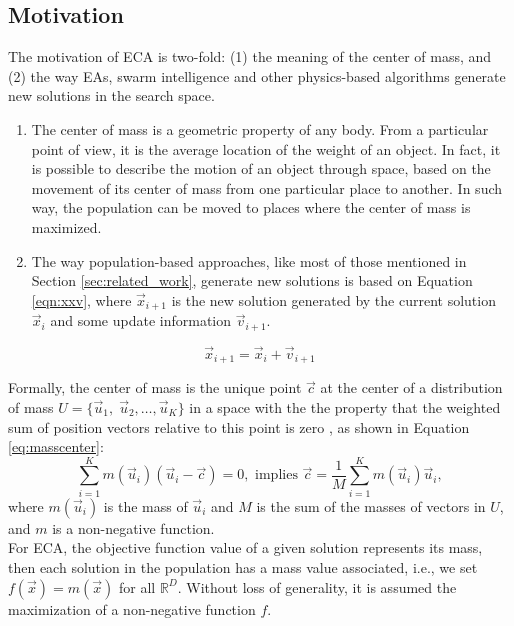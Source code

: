 \documentclass[conference]{IEEEtran}
\begin{document}
%
%
\subsection{Motivation} %
The motivation of ECA is two-fold: (1) the meaning of the center of mass, and (2) 
the way EAs, swarm intelligence and other physics-based algorithms generate new 
solutions in the search space. 
% 
\begin{enumerate}
	\item The center of mass is a geometric property of any body. From a particular 
		  point of view, it is the average location of the weight of an object. 
		  In fact, it is possible to describe the motion of an object through 
		  space, based on the movement of its center of mass from one particular 
		  place to another. In such way, the population can be moved to places 
		  where the center of mass is maximized. 
	\item The way population-based approaches, like most of those mentioned in 
		  Section \ref{sec:related_work}, generate new solutions is based on 
		  Equation \ref{eqn:xxv}, where $\vec{x}_{i + 1}$ is the new solution 
		  generated by the current solution $\vec{x}_{i}$ and some update 
		  information $\vec{v}_{i + 1}$. 
\end{enumerate}
\begin{equation}
	\vec{x}_{i + 1} = \vec{x}_{i} + \vec{v}_{i + 1}
	\label{eqn:xxv}
\end{equation}
% 

Formally, the center of mass is the unique point $\vec{c}$ at the center of a 
distribution of mass $U = \{\vec{u}_1,\; \vec{u}_2 , \ldots , \vec{u}_K \}$ in a 
space with the the property that the weighted sum of position vectors relative 
to this point is zero \cite{kleppner73,serway}, as shown in Equation \ref{eq:masscenter}:
%
%
\begin{equation}
	\sum_{i = 1}^K m(\vec{u}_i) (\vec{u}_i - \vec{c}) = 0, \text{ implies } 
	\vec{c} = \dfrac{1}{M} \sum_{i = 1}^K  m(\vec{u}_i)  \vec{u}_i,
	\label{eq:masscenter}
\end{equation}
%
%
where $m(\vec{u}_i)$ is the mass of $\vec{u}_i$ and  $M$ is the sum of the 
masses of vectors in $U$, and $m$ is a non-negative function.\\


For ECA, the objective function value of a given solution represents
its mass, then each solution in the population has a mass value associated,  i.e., 
we set $f(\vec{x}) = m(\vec{x})$ for all $\mathbb{R}^D$. Without loss of generality, 
it is assumed the maximization of a non-negative function $f$.
\end{document}
